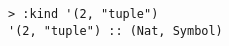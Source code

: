 \begin{repl}\begin{lstlisting}
> :kind '(2, "tuple")
'(2, "tuple") :: (Nat, Symbol)\end{lstlisting}\end{repl}
